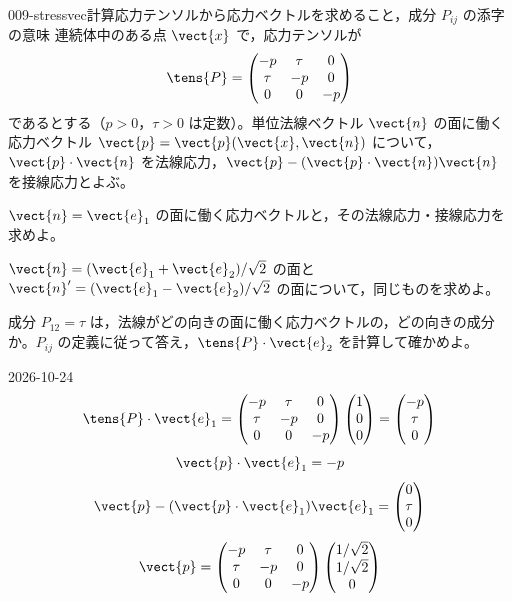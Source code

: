 \documentclass[uplatex,dvipdfmx,a4paper,11pt]{jsarticle}
\begin{document}
\mondaihen
{}
\begin{mondai}{009-stressvec}{計算}{応力テンソルから応力ベクトルを求めること，成分 $P_{ij}$ の添字の意味}
連続体中のある点 $\vect{x}$ で，応力テンソルが
\[ \tens{P}=\begin{pmatrix} -p & \tau & 0\\ \tau & -p & 0\\ 0 & 0 & -p \end{pmatrix} \]
であるとする（$p>0$，$\tau>0$ は定数）。単位法線ベクトル $\vect{n}$ の面に働く応力ベクトル $\vect{p}=\vect{p}(\vect{x},\vect{n})$ について，$\vect{p}\cdot\vect{n}$ を法線応力，$\vect{p}-(\vect{p}\cdot\vect{n})\vect{n}$ を接線応力とよぶ。
\begin{shoumon}
  \item $\vect{n}=\vect{e}_1$ の面に働く応力ベクトルと，その法線応力・接線応力を求めよ。
  \item $\vect{n}=(\vect{e}_1+\vect{e}_2)/\sqrt{2}$ の面と $\vect{n}'=(\vect{e}_1-\vect{e}_2)/\sqrt{2}$ の面について，同じものを求めよ。
  \item 成分 $P_{12}=\tau$ は，法線がどの向きの面に働く応力ベクトルの，どの向きの成分か。$P_{ij}$ の定義に従って答え，$\tens{P}\cdot\vect{e}_2$ を計算して確かめよ。
\end{shoumon}
\begin{kotaeutsushi}{2026-10-24}
\[ \tens{P}\cdot\vect{e}_{1}=\begin{pmatrix}-p&\tau&0\\\tau&-p&0\\0&0&-p\end{pmatrix}\begin{pmatrix}1\\0\\0\end{pmatrix}=\begin{pmatrix}-p\\\tau\\0\end{pmatrix} \]
\[ \vect{p}\cdot\vect{e}_{1}=-p \]
\[ \vect{p}-(\vect{p}\cdot\vect{e}_{1})\vect{e}_{1}=\begin{pmatrix}0\\\tau\\0\end{pmatrix} \]
\begin{align*}
\vect{p}&=\begin{pmatrix}-p&\tau&0\\\tau&-p&0\\0&0&-p\end{pmatrix}\begin{pmatrix}1/\sqrt{2}\\1/\sqrt{2}\\0\end{pmatrix}\\

\end{align*}
\end{kotaeutsushi}
\end{mondai}
\end{document}
